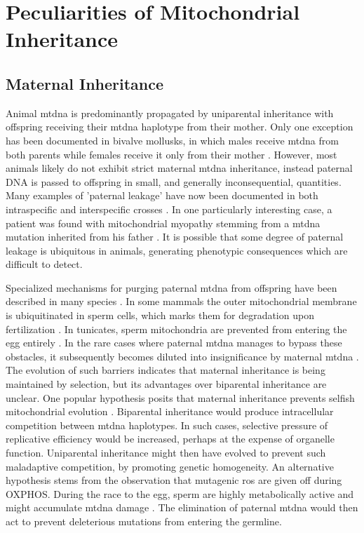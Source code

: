 \documentclass[12pt,twoside]{reedthesis}
\begin{document}
\section{Peculiarities of Mitochondrial Inheritance}
\subsection{Maternal Inheritance}
Animal \gls{mtdna} is predominantly propagated by uniparental inheritance with offspring receiving their \gls{mtdna} haplotype from their mother.
Only one exception has been documented in bivalve mollusks, in which males receive \gls{mtdna} from both parents while females receive it only from their mother \citep{zouros_unusual_1994}.
However, most animals likely do not exhibit strict maternal \gls{mtdna} inheritance, instead paternal DNA is passed to offspring in small, and generally inconsequential, quantities.
Many examples of 'paternal leakage' have now been documented in both intraspecific and interspecific crosses \citep{kvist_paternal_2003, meusel_transfer_1993, zhao_further_2004, wolff_paternal_2013, robison_extensive_2015}.
In one particularly interesting case, a patient was found with mitochondrial myopathy stemming from a \gls{mtdna} mutation inherited from his father \citep{schwartz_paternal_2002}.
It is possible that some degree of paternal leakage is ubiquitous in animals, generating phenotypic consequences which are difficult to detect.

Specialized mechanisms for purging paternal \gls{mtdna} from offspring have been described in many species \citep{sato_maternal_2013}.
In some mammals the outer mitochondrial membrane is ubiquitinated in sperm cells, which marks them for degradation upon fertilization \citep{sutovsky_ubiquitin-dependent_2003}.
In tunicates, sperm mitochondria are prevented from entering the egg entirely \citep{ursprung_fertilization_1965}.
In the rare cases where paternal \gls{mtdna} manages to bypass these obstacles, it subsequently becomes diluted into insignificance by maternal \gls{mtdna} \citep{wolff_lost_2008}.
The evolution of such barriers indicates that maternal inheritance is being maintained by selection, but its advantages over biparental inheritance are unclear.
One popular hypothesis posits that maternal inheritance prevents selfish mitochondrial evolution \citep{hastings_population_1992}.
Biparental inheritance would produce intracellular competition between \gls{mtdna} haplotypes.
In such cases, selective pressure of replicative efficiency would be increased, perhaps at the expense of organelle function.
Uniparental inheritance might then have evolved to prevent such maladaptive competition, by promoting genetic homogeneity.
An alternative hypothesis stems from the observation that mutagenic \gls{ros} are given off during OXPHOS.
During the race to the egg, sperm are highly metabolically active and might accumulate \gls{mtdna} damage \citep{allen_separate_1996}.
The elimination of paternal \gls{mtdna} would then act to prevent deleterious mutations from entering the germline.
\end{document}
